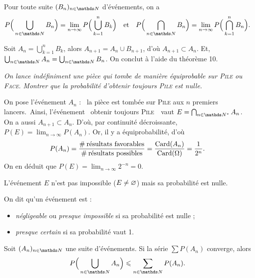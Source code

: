 \begin{crlr}
	Pour toute suite $(B_n)_{n\in\N}$\/ d'événements, on a \[
		P\Big(\bigcup_{n \in \N} B_n\Big) = \lim_{n\to \infty} P\Big(\bigcup_{k = 1}^n B_k\Big)\quad \text{et}\quad P\Big(\bigcap_{n \in \N} B_n\Big) = \lim_{n\to \infty} P\Big(\bigcap_{k=1}^n B_n\Big).
	\]
\end{crlr}

\begin{prv}
	Soit $A_n = \bigcup_{k=1}^n B_k$, alors $A_{n+1} = A_n \cup B_{n+1}$, d'où $A_{n+1} \subset A_n$. Et, $\bigcup_{n \in \N} A_n = \bigcup_{n \in \N} B_n$. On conclut à l'aide du théorème 10.
\end{prv}

\begin{exo}
	\textsl{On lance indéfiniment une pièce qui tombe de manière équiprobable sur \textsc{Pile} ou \textsc{Face}. Montrer que la probabilité d'obtenir toujours \textsc{Pile} est nulle.}

	On pose l'événement $A_n$\/ : \guillemotleft~la pièce est tombée sur \textsc{Pile} aux $n$ premiers lancers.~\guillemotright\@ Ainsi, l'événement \guillemotleft~obtenir toujours \textsc{Pile}~\guillemotright\ vaut $E = \bigcap_{n \in \N^*} A_n$. On a aussi $A_{n+1} \subset A_n$. D'où, par continuité décroissante, $P(E) = \lim_{n\to \infty} P(A_n)$. Or, il y a équiprobabilité, d'où
	\[
		P(A_n) = \frac{\text{\#\:résultats favorables}}{\text{\#\:résultats possibles}} = \frac{\operatorname{Card}(A_n)}{\operatorname{Card}(\Omega)} = \frac{1}{2^n}
	.\] On en déduit que $P(E) = \lim_{n\to \infty}2^{-n} = 0$.

	L'événement $E$\/ n'est pas impossible ($E \neq \varnothing$) mais sa probabilité est nulle.
\end{exo}

\begin{defn}
	On dit qu'un événement est :
	\begin{itemize}
		\item \textit{négligeable} ou \textit{presque impossible} si sa probabilité est nulle ;
		\item \textit{presque certain} si sa probabilité vaut 1.
	\end{itemize}
\end{defn}

\begin{prop}
	Soit $(A_n)_{n\in\N}$\/ une suite d'événements. Si la série $\sum P(A_n)$\/ converge, alors \[
		P\Big(\bigcup_{n \in \N} A_n\Big) \le \sum_{n \in \N} P(A_n)
	.\]
\end{prop}


